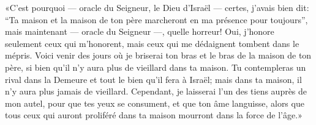 «C’est pourquoi --- oracle du Seigneur, le Dieu d’Israël ---
	certes, j’avais bien dit:
	“Ta maison et la maison de ton père marcheront en ma présence pour toujours”,
	mais maintenant --- oracle du Seigneur ---, quelle horreur!
	Oui, j’honore seulement ceux qui m’honorent,
	mais ceux qui me dédaignent tombent dans le mépris.
Voici venir des jours où je briserai ton bras et le bras de la maison de ton père,
	si bien qu’il n’y aura plus de vieillard dans ta maison.
Tu contempleras un rival dans la Demeure et tout le bien qu’il fera à Israël;
	mais dans ta maison, il n’y aura plus jamais de vieillard.
Cependant, je laisserai l’un des tiens auprès de mon autel,
	pour que tes yeux se consument, et que ton âme languisse,
	alors que tous ceux qui auront proliféré dans ta maison
		mourront dans la force de l’âge.»
